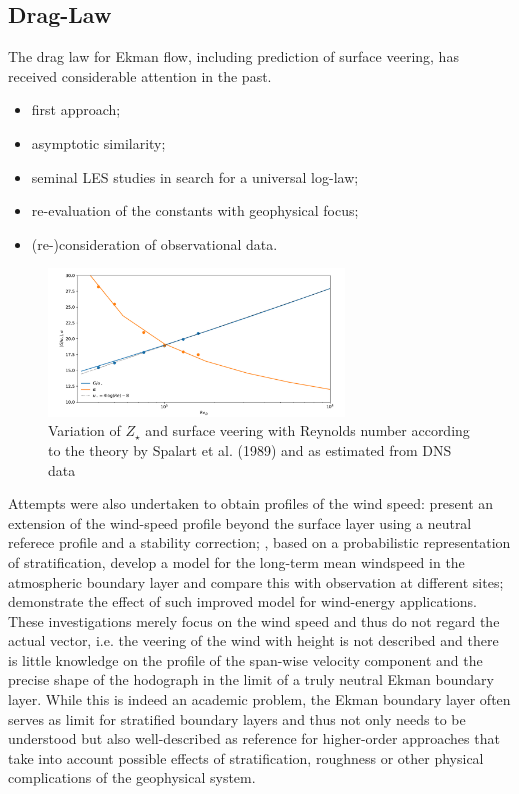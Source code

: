 \documentclass[a4paper,11pt]{article}
\begin{document}
\subsection{Drag-Law} 
The drag law for Ekman flow, including prediction of surface veering, has received considerable attention in the past.
\begin{itemize}
\item \cite{Rossby:1935wa} first approach;
\item \cite{Tennekes:1973jh, Blackadar:1968ew} asymptotic similarity;
\item \cite{Spalart:1989p2436, Spalart:2008p2432, Spalart:2009p2466} seminal LES studies in search for a universal log-law;
\item \cite{Ansorge:2014hf, Ansorge:2019di} re-evaluation of the constants with geophysical focus;
\item \cite{Hogstrom:1988wg, Hgstrm:1996kt} (re-)consideration of observational data.

\end{itemize}
\begin{figure}
  \centerline{\includegraphics[width=0.7\textwidth]{../plot/ustar_alpha.pdf}}
  \caption{Variation of $Z_\star$ and surface veering with Reynolds number according to
    the theory by Spalart et al. (1989) and as estimated from DNS data}
  \label{fig:drag_law}
\end{figure} 
%
Attempts were also undertaken to obtain profiles of the wind speed: 
\cite{Gryning:2007dy} present an extension of the wind-speed profile beyond the surface layer using a neutral referece profile
and a stability correction;
\cite{Kelly:2010ev}, based on a probabilistic representation of stratification, develop a model for the long-term mean windspeed
in the atmospheric boundary layer and compare this with observation at different sites; 
\cite{Kelly:2016bs} demonstrate the effect of such improved model for wind-energy applications.
%
These investigations merely focus on the wind speed and thus do not regard the actual vector, i.e. the veering of
the wind with height is not described and there is little knowledge on the profile of the span-wise velocity component
and the precise shape of the hodograph in the limit of a truly neutral Ekman boundary layer.
%
While this is indeed an academic problem, the Ekman boundary layer often serves as limit for stratified boundary layers
and thus not only needs to be understood but also well-described as reference for higher-order approaches that take into
account possible effects of stratification, roughness or other physical complications of the geophysical system.
%
\end{document}
